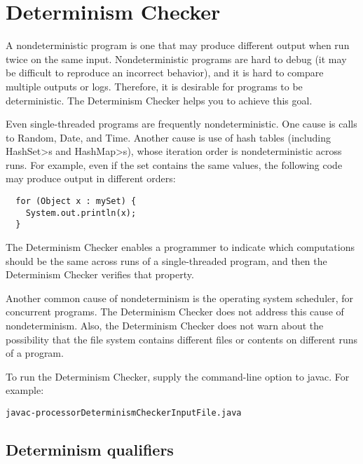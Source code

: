 \htmlhr
\chapter{Determinism Checker\label{determinism-checker}}

A nondeterministic program is one that may produce different output when
run twice on the same input.  Nondeterministic programs are hard to debug
(it may be difficult to reproduce an incorrect behavior), and it is hard to
compare multiple outputs or logs.
Therefore, it is desirable for programs to be deterministic.
The Determinism Checker helps you to achieve this goal.

Even single-threaded programs are frequently nondeterministic.
One cause is calls to Random, Date, and Time.
Another cause is use of hash tables (including \<HashSet>s and
\<HashMap>s), whose iteration order is nondeterministic across runs.
For example, even if the set contains the same values, the following code
may produce output in different orders:

\begin{Verbatim}
  for (Object x : mySet) {
    System.out.println(x);
  }
\end{Verbatim}

The Determinism Checker enables a programmer to indicate which
computations should be the same across runs of a single-threaded program,
and then the Determinism Checker verifies that property.

Another common cause of nondeterminism is the operating system scheduler,
for concurrent programs.  The Determinism Checker does not address this
cause of nondeterminism.  Also, the Determinism Checker does not warn
about the possibility that the file system contains different files or
contents on different runs of a program.

To run the Determinism Checker, supply the
command-line option to javac.
For example:

\begin{alltt}
  javac -processor DeterminismChecker InputFile.java
\end{alltt}



\section{Determinism qualifiers\label{determinism-qualifiers}}

